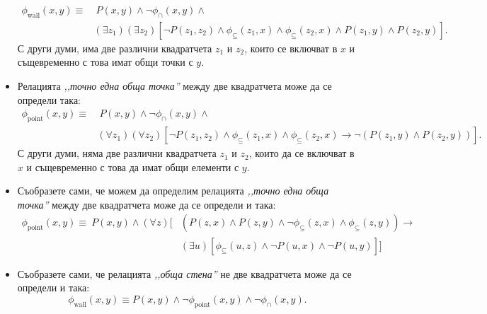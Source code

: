 \begin{example}
\begin{itemize}
\begin{align*}
      \phi_{\text{wall}}(x,y) \equiv & \ P(x,y) \land \neg \phi_{\cap}(x,y) \land\\
                                     & (\exists z_1)(\exists z_2)[\neg P(z_1,z_2) \land \phi_{\subseteq}(z_1,x) \land \phi_{\subseteq}(z_2,x) \land P(z_1,y)\land P(z_2,y)].
    \end{align*}
    С други думи, има две различни квадратчета $z_1$ и $z_2$, които се включват в $x$ и същевременно с това имат общи точки с $y$.
  \item
    Релацията \emph{,,точно една обща точка''} между две квадратчета може да се определи така:
    \begin{align*}
      \phi_{\text{point}}(x,y) \equiv & \ P(x,y) \land \neg \phi_{\cap}(x,y) \land\\
                                      & (\forall z_1)(\forall z_2)[\neg P(z_1,z_2) \land \phi_{\subseteq}(z_1,x) \land \phi_{\subseteq}(z_2,x) \to \neg(P(z_1,y)\land P(z_2,y))].
    \end{align*}
    С други думи, няма две различни квадратчета $z_1$ и $z_2$, които да се включват в $x$ и същевременно с това да имат общи елементи с $y$.
  \item
    Съобразете сами, че можем да определим релацията \emph{,,точно една обща точка''} между две квадратчета може да се определи и така:
    \begin{align*}
      \phi_{\text{point}}(x,y) \equiv \ P(x,y) \land (\forall z)[ & ( P(z,x) \land P(z,y) \land \neg \phi_{\subseteq}(z,x) \land \phi_{\subseteq}(z,y)) \to \\
                                                                  & (\exists u)[\phi_{\subseteq}(u,z) \land \neg P(u,x) \land \neg P(u,y)]] 
    \end{align*}
  \item
    Съобразете сами, че релацията \emph{,,обща стена''} не две квадратчета може да се определи и така:
    \[\phi_{\text{wall}}(x,y) \equiv P(x,y) \land \neg \phi_{\text{point}}(x,y) \land \neg \phi_{\cap}(x,y).\]
  \end{itemize}
\end{example}


